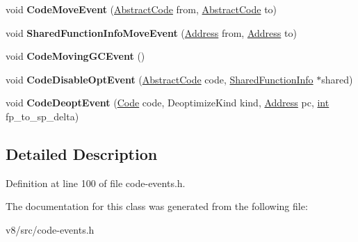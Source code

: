 \begin{DoxyCompactItemize}
\item 
\mbox{\label{classv8_1_1internal_1_1CodeEventDispatcher_ae9c37c3dc4647c402ca984e9c13d38b3}} 
void {\bfseries Code\+Move\+Event} (\mbox{\hyperlink{classv8_1_1internal_1_1AbstractCode}{Abstract\+Code}} from, \mbox{\hyperlink{classv8_1_1internal_1_1AbstractCode}{Abstract\+Code}} to)
\item 
\mbox{\label{classv8_1_1internal_1_1CodeEventDispatcher_aa77baa815dd984a8f96a8822f01e1321}} 
void {\bfseries Shared\+Function\+Info\+Move\+Event} (\mbox{\hyperlink{classuintptr__t}{Address}} from, \mbox{\hyperlink{classuintptr__t}{Address}} to)
\item 
\mbox{\label{classv8_1_1internal_1_1CodeEventDispatcher_a031f4ff3f62ac16388af26552a5fe839}} 
void {\bfseries Code\+Moving\+G\+C\+Event} ()
\item 
\mbox{\label{classv8_1_1internal_1_1CodeEventDispatcher_a4cc93a923b24eda18b999ee222723980}} 
void {\bfseries Code\+Disable\+Opt\+Event} (\mbox{\hyperlink{classv8_1_1internal_1_1AbstractCode}{Abstract\+Code}} code, \mbox{\hyperlink{classv8_1_1internal_1_1SharedFunctionInfo}{Shared\+Function\+Info}} $\ast$shared)
\item 
\mbox{\label{classv8_1_1internal_1_1CodeEventDispatcher_aab3c4fcea8ae48a4788482a49a14bc36}} 
void {\bfseries Code\+Deopt\+Event} (\mbox{\hyperlink{classv8_1_1internal_1_1Code}{Code}} code, Deoptimize\+Kind kind, \mbox{\hyperlink{classuintptr__t}{Address}} pc, \mbox{\hyperlink{classint}{int}} fp\+\_\+to\+\_\+sp\+\_\+delta)
\end{DoxyCompactItemize}


\subsection{Detailed Description}


Definition at line 100 of file code-\/events.\+h.



The documentation for this class was generated from the following file\+:\begin{DoxyCompactItemize}
\item 
v8/src/code-\/events.\+h\end{DoxyCompactItemize}
